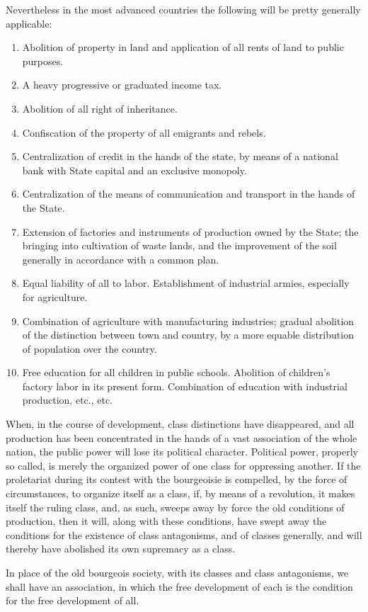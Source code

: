 Nevertheless in the most advanced countries the following will be pretty generally applicable:
\begin{enumerate}
	\item Abolition of property in land and application of all rents of land to public purposes.
	\item A heavy progressive or graduated income tax.
	\item Abolition of all right of inheritance.
	\item Confiscation of the property of all emigrants and rebels.
	\item Centralization of credit in the hands of the state, by means of a national bank with State capital and an exclusive monopoly.
	\item Centralization of the means of communication and transport in the hands of the State.
	\item Extension of factories and instruments of production owned by the State; the bringing into cultivation of waste lands, and the improvement of the soil generally in accordance with a common plan.
	\item Equal liability of all to labor. Establishment of industrial armies, especially for agriculture.
	\item Combination of agriculture with manufacturing industries; gradual abolition of the distinction between town and country, by a more equable distribution of population over the country.
	\item Free education for all children in public schools. Abolition of children's factory labor in its present form. Combination of education with industrial production, etc., etc.
\end{enumerate}
When, in the course of development, class distinctions have disappeared, and all production has been concentrated in the hands of a vast association of the whole nation, the public power will lose its political character. Political power, properly so called, is merely the organized power of one class for oppressing another. If the proletariat during its contest with the bourgeoisie is compelled, by the force of circumstances, to organize itself as a class, if, by means of a revolution, it makes itself the ruling class, and, as such, sweeps away by force the old conditions of production, then it will, along with these conditions, have swept away the conditions for the existence of class antagonisms, and of classes generally, and will thereby have abolished its own supremacy as a class.

In place of the old bourgeois society, with its classes and class antagonisms, we shall have an association, in which the free development of each is the condition for the free development of all.